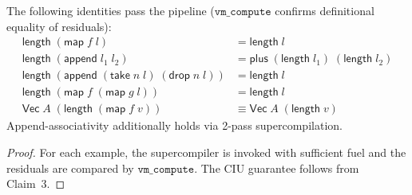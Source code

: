 \begin{proposition}[Examples]
\label{prop:examples}
The following identities pass the pipeline ($\texttt{vm\_compute}$ confirms definitional equality of residuals):
\begin{align*}
  \mathsf{length}\;(\mathsf{map}\;f\;l) &= \mathsf{length}\;l \\
  \mathsf{length}\;(\mathsf{append}\;l_1\;l_2) &= \mathsf{plus}\;(\mathsf{length}\;l_1)\;(\mathsf{length}\;l_2) \\
  \mathsf{length}\;(\mathsf{append}\;(\mathsf{take}\;n\;l)\;(\mathsf{drop}\;n\;l)) &= \mathsf{length}\;l \\
  \mathsf{length}\;(\mathsf{map}\;f\;(\mathsf{map}\;g\;l)) &= \mathsf{length}\;l \\
  \mathsf{Vec}\;A\;(\mathsf{length}\;(\mathsf{map}\;f\;v)) &\equiv \mathsf{Vec}\;A\;(\mathsf{length}\;v)
\end{align*}
Append-associativity additionally holds via 2-pass supercompilation.
\end{proposition}

\begin{proof}
For each example, the supercompiler is invoked with sufficient fuel and the residuals are compared by $\texttt{vm\_compute}$. The CIU guarantee follows from Claim~3.
\end{proof}
